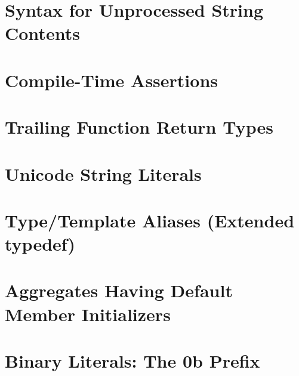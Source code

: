 \newpage
\section[Raw String Literals]{Syntax for Unprocessed String Contents}\label{raw-string-literals}


\newpage
\section[{\tt static\_assert}]{Compile-Time Assertions}\label{compile-time-assertions-(static_assert)}


\newpage
\section[Trailing Return]{Trailing Function Return Types}\label{trailing-function-return-types}


\newpage
\section[Unicode Literals]{Unicode String Literals}\label{unicode-string-and-character-literals}


\newpage
\section[{\tt using} Aliases]{Type/Template Aliases (Extended {\SecCode typedef})}\label{alias-declarations-and-alias-templates}



\renewcommand{\cppxx}{C++14}

\newpage
{}
\section[Aggregate Init '14]{Aggregates Having Default Member Initializers}\label{aggregate-member-initialization-relaxation}
\renewcommand{\cppxx}{C++14}%


\newpage
\section[Binary Literals]{Binary Literals: The {\SecCode 0b} Prefix}\label{binary-literals}


